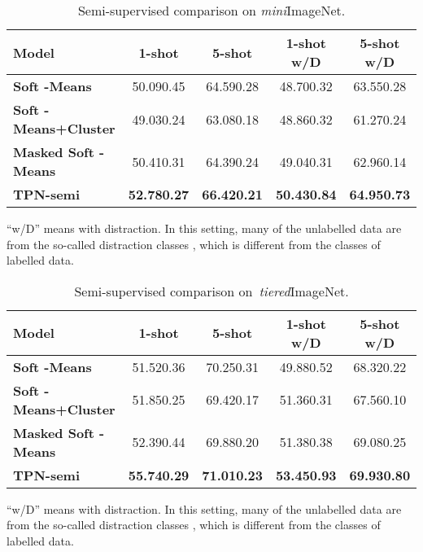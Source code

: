 \documentclass{article} \usepackage{iclr2019_conference,times}
\def\mini{{\textit{mini}ImageNet}}
\def\tiered{{\textit{tiered}ImageNet}}
\begin{document}
\begin{table}[ht]
\centering
\begin{threeparttable}
\small
\caption{Semi-supervised comparison on \mini.}
\label{semi-mini-std}
\begin{tabular}{lcccc}
\hline
Model   & \multicolumn{1}{c}{1-shot} & \multicolumn{1}{c}{5-shot} & \multicolumn{1}{c}{1-shot w/D} & \multicolumn{1}{c}{5-shot w/D} \\ \hline
\textbf{Soft -Means}          & 50.090.45 & 64.590.28 & 48.700.32 & 63.550.28 \\
\textbf{Soft -Means+Cluster}  & 49.030.24 & 63.080.18 & 48.860.32 & 61.270.24 \\
\textbf{Masked Soft -Means}   & 50.410.31 & 64.390.24 & 49.040.31 & 62.960.14 \\ \hline
\textbf{TPN-semi}                & \textbf{52.780.27} & \textbf{66.420.21} & \textbf{50.430.84} & \textbf{64.950.73}\\ \hline
\end{tabular}
\begin{tablenotes}
  	\item * ``w/D'' means with distraction. In this setting, many of the unlabelled data are from the so-called distraction classes , which is different from the classes of labelled data.
\end{tablenotes} 
\end{threeparttable}
\end{table}


\begin{table}[ht]
\centering
\begin{threeparttable}
\small
\caption{Semi-supervised comparison on~\tiered.}
\label{semi-tiered-std}
\begin{tabular}{lcccc}
\hline
Model                            						 & \multicolumn{1}{c}{1-shot} & \multicolumn{1}{c}{5-shot} & \multicolumn{1}{c}{1-shot w/D} & \multicolumn{1}{c}{5-shot w/D} \\ \hline
\textbf{Soft -Means}          & 51.520.36 & 70.250.31 & 49.880.52 & 68.320.22\\
\textbf{Soft -Means+Cluster}  & 51.850.25 & 69.420.17 & 51.360.31 & 67.560.10\\
\textbf{Masked Soft -Means}   & 52.390.44 & 69.880.20 & 51.380.38 & 69.080.25\\ \hline
\textbf{TPN-semi}                & \textbf{55.740.29} & \textbf{71.010.23} & \textbf{53.450.93} & \textbf{69.930.80}\\ \hline
\end{tabular}
\begin{tablenotes}
  	\item * ``w/D'' means with distraction. In this setting, many of the unlabelled data are from the so-called distraction classes , which is different from the classes of labelled data.
\end{tablenotes} 
\end{threeparttable}
\end{table}
\end{document}
